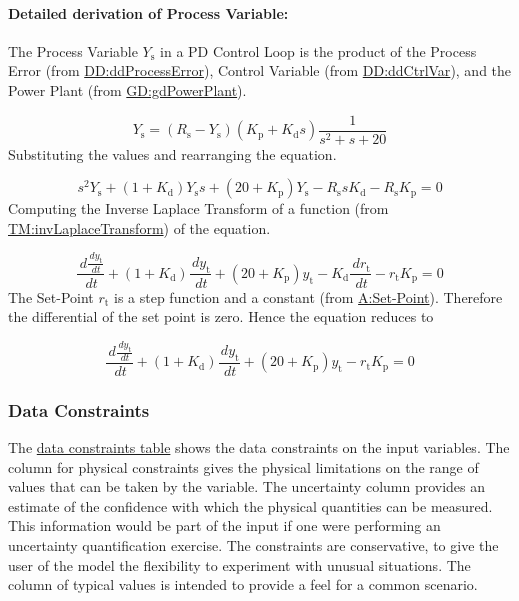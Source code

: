 \documentclass[12pt]{article}
\begin{document}
\paragraph{Detailed derivation of Process Variable:}
\label{IM:pdEquationIMDeriv}
The Process Variable ${Y_{\text{s}}}$ in a PD Control Loop is the product of the Process Error (from \hyperref[DD:ddProcessError]{DD:ddProcessError}), Control Variable (from \hyperref[DD:ddCtrlVar]{DD:ddCtrlVar}), and the Power Plant (from \hyperref[GD:gdPowerPlant]{GD:gdPowerPlant}).

\begin{displaymath}
{Y_{\text{s}}}=\left({R_{\text{s}}}-{Y_{\text{s}}}\right) \left({K_{\text{p}}}+{K_{\text{d}}} s\right) \frac{1}{s^{2}+s+20}
\end{displaymath}
Substituting the values and rearranging the equation.

\begin{displaymath}
s^{2} {Y_{\text{s}}}+\left(1+{K_{\text{d}}}\right) {Y_{\text{s}}} s+\left(20+{K_{\text{p}}}\right) {Y_{\text{s}}}-{R_{\text{s}}} s {K_{\text{d}}}-{R_{\text{s}}} {K_{\text{p}}}=0
\end{displaymath}
Computing the Inverse Laplace Transform of a function (from \hyperref[TM:invLaplaceTransform]{TM:invLaplaceTransform}) of the equation.

\begin{displaymath}
\frac{\,d\frac{\,d{y_{\text{t}}}}{\,dt}}{\,dt}+\left(1+{K_{\text{d}}}\right) \frac{\,d{y_{\text{t}}}}{\,dt}+\left(20+{K_{\text{p}}}\right) {y_{\text{t}}}-{K_{\text{d}}} \frac{\,d{r_{\text{t}}}}{\,dt}-{r_{\text{t}}} {K_{\text{p}}}=0
\end{displaymath}
The Set-Point ${r_{\text{t}}}$ is a step function and a constant (from \hyperref[setPoint]{A:Set-Point}). Therefore the differential of the set point is zero. Hence the equation reduces to

\begin{displaymath}
\frac{\,d\frac{\,d{y_{\text{t}}}}{\,dt}}{\,dt}+\left(1+{K_{\text{d}}}\right) \frac{\,d{y_{\text{t}}}}{\,dt}+\left(20+{K_{\text{p}}}\right) {y_{\text{t}}}-{r_{\text{t}}} {K_{\text{p}}}=0
\end{displaymath}
\subsubsection{Data Constraints}
\label{Sec:DataConstraints}
The \hyperref[Table:InDataConstraints]{data constraints table} shows the data constraints on the input variables. The column for physical constraints gives the physical limitations on the range of values that can be taken by the variable. The uncertainty column provides an estimate of the confidence with which the physical quantities can be measured. This information would be part of the input if one were performing an uncertainty quantification exercise. The constraints are conservative, to give the user of the model the flexibility to experiment with unusual situations. The column of typical values is intended to provide a feel for a common scenario.
\end{document}
